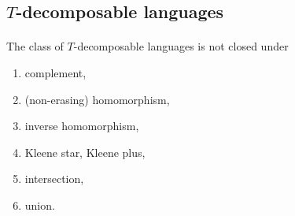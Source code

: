 \subsection{$T$-decomposable languages}

\paragraph{}
\cveta The class of $T$-decomposable languages is not closed under 
\begin{enumerate}
\item complement,
\item (non-erasing) homomorphism,
\item inverse homomorphism,
\item Kleene star, Kleene plus,
\item intersection,
\item union.
\end{enumerate}

